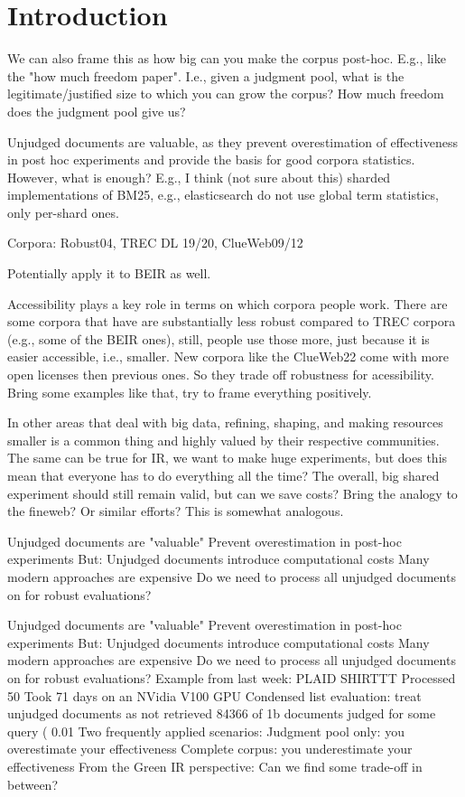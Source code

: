 \section{Introduction}

We can also frame this as how big can you make the corpus post-hoc. E.g., like the "how much freedom paper". I.e., given a judgment pool, what is the legitimate/justified size to which you can grow the corpus? How much freedom does the judgment pool give us?

Unjudged documents are valuable, as they prevent overestimation of effectiveness in post hoc experiments and provide the basis for good corpora statistics. However, what is enough? E.g., I think (not sure about this) sharded implementations of BM25, e.g., elasticsearch do not use global term statistics, only per-shard ones.

Corpora: Robust04, TREC DL 19/20, ClueWeb09/12

Potentially apply it to BEIR as well.


Accessibility plays a key role in terms on which corpora people work. There are some corpora that have are substantially less robust compared to TREC corpora (e.g., some of the BEIR ones), still, people use those more, just because it is easier accessible, i.e., smaller. New corpora like the ClueWeb22 come with more open licenses then previous ones. So they trade off robustness for acessibility. Bring some examples like that, try to frame everything positively.

In other areas that deal with big data, refining, shaping, and making resources smaller is a common thing and highly valued by their respective communities. The same can be true for IR, we want to make huge experiments, but does this mean that everyone has to do everything all the time? The overall, big shared experiment should still remain valid, but can we save costs?
Bring the analogy to the fineweb? Or similar efforts? This is somewhat analogous.


Unjudged documents are "valuable"
Prevent overestimation in post-hoc experiments
But: Unjudged documents introduce computational costs
Many modern approaches are expensive
Do we need to process all unjudged documents on for robust evaluations?




Unjudged documents are "valuable"
Prevent overestimation in post-hoc experiments
But: Unjudged documents introduce computational costs
Many modern approaches are expensive
Do we need to process all unjudged documents on for robust evaluations?
Example from last week: PLAID SHIRTTT
Processed 50%
Took 71 days on an NVidia V100 GPU
Condensed list evaluation: treat unjudged documents as not retrieved
84366 of 1b documents judged for some query ( 0.01%
Two frequently applied scenarios:
Judgment pool only: you overestimate your effectiveness
Complete corpus: you underestimate your effectiveness
From the Green IR perspective: Can we find some trade-off in between?



